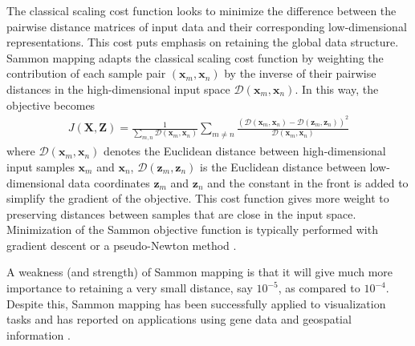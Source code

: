 The classical scaling cost function looks to minimize the difference between the pairwise distance matrices of input data and their corresponding low-dimensional representations.  This cost puts emphasis on retaining the global data structure.  Sammon mapping adapts the classical scaling cost function by weighting the contribution of each sample pair $(\bm{x}_{m},\bm{x}_{n})$ by the inverse of their pairwise distances in the high-dimensional input space $\mathcal{D}(\bm{x}_{m},\bm{x}_{n})$.  In this way, the objective becomes
\begin{align}
	J(\bm{X},\bm{Z}) = \frac{1}{\sum_{m,n}\mathcal{D}(\bm{x}_{m},\bm{x}_{n})}\sum_{m \neq n} \frac{(\mathcal{D}(\bm{x}_{m},\bm{x}_{n}) - \mathcal{D}(\bm{z}_{m},\bm{z}_{n}))^{2}}{\mathcal{D}(\bm{x}_{m},\bm{x}_{n})}
\end{align}
\noindent
where $\mathcal{D}(\bm{x}_{m},\bm{x}_{n})$ denotes the Euclidean distance between high-dimensional input samples $\bm{x}_{m}$ and $\bm{x}_{n}$, $\mathcal{D}(\bm{z}_{m},\bm{z}_{n})$ is the Euclidean distance between low-dimensional data coordinates $\bm{z}_{m}$ and $\bm{z}_{n}$ and the constant in the front is added to simplify the gradient of the objective.  This cost function gives more weight to preserving distances between samples that are close in the input space.   Minimization of the Sammon objective function is typically performed with gradient descent or a pseudo-Newton method \citep{Sorzano2014DRReview}.

A weakness (and strength) of Sammon mapping is that it will give much more importance to retaining a very small distance, say $10^{-5}$, as compared to  $10^{-4}$.  Despite this, Sammon mapping has been successfully applied to visualization tasks and has reported on applications using gene data and geospatial information \citep{VanDerMaaten2009DRReview}.

